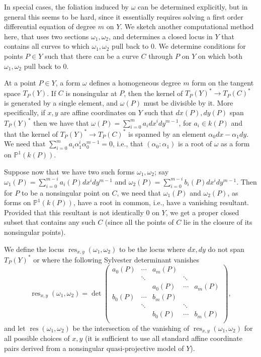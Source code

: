 \documentclass[12pt, reqno]{amsart}
\theoremstyle{definition}
\newcommand{\PP}{{\mathbb P}}
\DeclareMathOperator{\res}{res}
\numberwithin{equation}{section}
\numberwithin{table}{section}
\begin{document}
In special cases, the foliation induced by $\omega$ can be determined explicitly, but in general this seems to be hard, since it essentially requires solving a first order differential equation of degree $m$ on $Y$. We sketch another computational method here, that uses two sections $\omega_1,\omega_2$, and determines a closed locus in $Y$ that contains all curves to which $\omega_1,\omega_2$ pull back to $0$. We determine conditions for points $P\in Y$ such that there can be a curve $C$ through $P$ on $Y$ on which both $\omega_1,\omega_2$ pull back to $0$.

At a point $P\in Y$, a form $\omega$ defines a homogeneous degree $m$ form on the tangent space $T_P(Y)$. If $C$ is nonsingular at $P$, then the kernel of $T_P(Y)^*\to T_P(C)^*$ is generated by a single element, and $\omega(P)$ must be divisible by it. More specifically, if  $x,y$ are affine coordinates on $Y$ such that $dx(P),dy(P)$ span $T_P(Y)^*$
then we have that $\omega(P)=\sum_{i=0}^{m} a_i dx^idy^{m-1}$, for $a_i\in k(P)$ and that the kernel of $T_P(Y)^*\to T_P(C)^*$ is spanned by an element $\alpha_0 dx-\alpha_1 dy$. We need that $\sum_{i=0}^{m} a_i \alpha_1^i\alpha_0^{m-1}=0$, i.e., that $(\alpha_0:\alpha_1)$ is a root of $\omega$ as a form on $\PP^1(k(P))$.

Suppose now that we have two such forms $\omega_1,\omega_2$; say $\omega_1(P)=\sum_{i=0}^{m-i} a_i(P) dx^idy^{m-1}$ and $\omega_2(P)=\sum_{i=0}^{m-i} b_i(P) dx^idy^{m-1}$. Then for $P$ to be a nonsingular point on $C$, we need that $\omega_1(P)$ and $\omega_2(P)$, as forms on $\PP^1(k(P))$, have a root in common, i.e., have a vanishing resultant. Provided that this resultant is not identically $0$ on $Y$, we get a proper closed subset that contains any such $C$ (since all the points of $C$ lie in the closure of its nonsingular points).

We define the locus $\res_{x,y}(\omega_1,\omega_2)$ to be the locus where $dx,dy$ do not span $T_P(Y)^*$ or where the following Sylvester determinant vanishes
\[\res_{x,y}(\omega_1,\omega_2)=\det\begin{pmatrix}
a_0(P)&\cdots&a_m(P)\\
&\ddots&&\ddots\\
&&a_0(P)&\cdots&a_m(P)\\
b_0(P)&\cdots&b_m(P)\\
&\ddots&&\ddots\\
&&b_0(P)&\cdots&b_m(P)\\
\end{pmatrix},\]
and let $\res(\omega_1,\omega_2)$ be the intersection of the vanishing of $\res_{x,y}(\omega_1,\omega_2)$ for all possible choices of $x,y$ (it is sufficient to use all standard affine coordinate pairs derived from a nonsingular quasi-projective model of $Y$).
\end{document}
